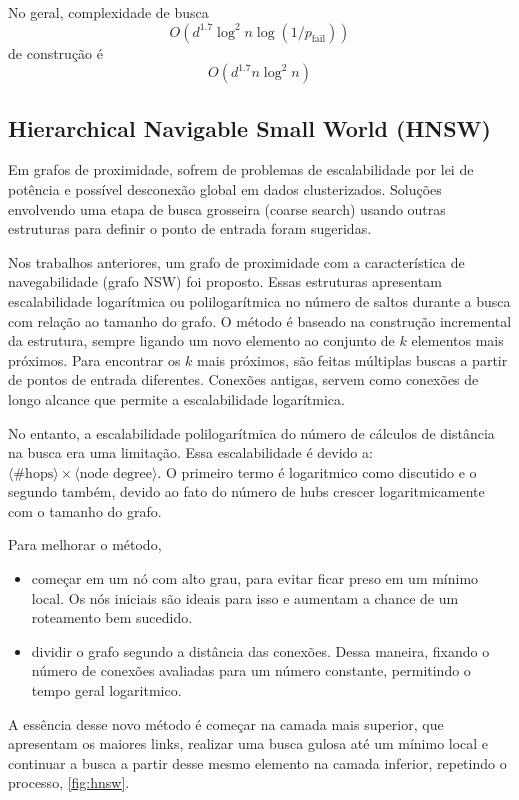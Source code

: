 No geral, complexidade de busca
$$O(d^{1.7}\log^2n \log(1/p_\text{fail}))$$
de construção é
$$O(d^{1.7}n\log^2n)$$

\subsection{Hierarchical Navigable Small World (HNSW)}

Em grafos de proximidade, sofrem de problemas de escalabilidade por lei de potência e possível desconexão global em dados clusterizados. Soluções envolvendo uma etapa de busca grosseira (coarse search) usando outras estruturas para definir o ponto de entrada foram sugeridas.

Nos trabalhos anteriores, um grafo de proximidade com a característica de navegabilidade (grafo NSW) foi proposto. Essas estruturas apresentam escalabilidade logarítmica ou polilogarítmica no número de saltos durante a busca com relação ao tamanho do grafo. O método é baseado na construção incremental da estrutura, sempre ligando um novo elemento ao conjunto de $k$ elementos mais próximos. Para encontrar os $k$ mais próximos, são feitas múltiplas buscas a partir de pontos de entrada diferentes. Conexões antigas, servem como conexões de longo alcance que permite a escalabilidade logarítmica.

No entanto, a escalabilidade polilogarítmica do número de cálculos de distância na busca era uma limitação. Essa escalabilidade é devido a: $\langle\text{\# hops}\rangle\times \langle\text{node degree}\rangle$. O primeiro termo é logaritmico como discutido e o segundo também, devido ao fato do número de hubs crescer logaritmicamente com o tamanho do grafo.

Para melhorar o método, 
\begin{itemize}
    \item começar em um nó com alto grau, para evitar ficar preso em um mínimo local. Os nós iniciais são ideais para isso e aumentam a chance de um roteamento bem sucedido. 
    \item dividir o grafo segundo a distância das conexões. Dessa maneira, fixando o número de conexões avaliadas para um número constante, permitindo o tempo geral logaritmico.
\end{itemize}

A essência desse novo método\cite{hnsw:malkov2018} é começar na camada mais superior, que apresentam os maiores links, realizar uma busca gulosa até um mínimo local e continuar a busca a partir desse mesmo elemento na camada inferior, repetindo o processo, \cref{fig:hnsw}.

